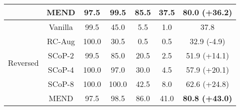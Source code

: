 \begin{table}[htbp]
{\begin{tabular}{ccccccc}
          & MEND  & 97.5  & 99.5  & 85.5  & 37.5  & \textbf{80.0 (\textcolor{my_green}{+36.2})} \\
    \midrule
    \multirow{6}[2]{*}{\begin{sideways}Reversed\end{sideways}} & Vanilla & 99.5  & 45.0  & 5.5   & 1.0   & 37.8  \\
          & RC-Aug & 100.0  & 30.5  & 0.5   & 0.5   & 32.9 (\textcolor{my_red}{-4.9}) \\
          & SCoP-2 & 99.5  & 85.0  & 20.5  & 2.5   & 51.9 (\textcolor{my_green}{+14.1}) \\
          & SCoP-4 & 100.0  & 97.0  & 30.0  & 4.5   & 57.9 (\textcolor{my_green}{+20.1}) \\
          & SCoP-8 & 100.0  & 100.0  & 42.5  & 8.0   & 62.6 (\textcolor{my_green}{+24.8}) \\
          & MEND  & 97.5  & 98.5  & 86.0  & 41.0  & \textbf{80.8 (\textcolor{my_green}{+43.0})} \\
    \bottomrule
    \end{tabular}%
    }
  \label{tab: permutation-topological}%
\end{table}%